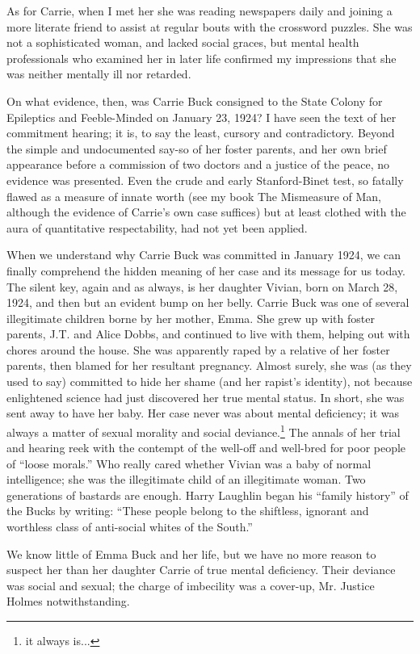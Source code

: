 \documentclass[12pt]{letter}
\begin{document}
As for Carrie, when I met her she was reading newspapers daily and joining a
more literate friend to assist at regular bouts with the crossword puzzles. She
was not a sophisticated woman, and lacked social graces, but mental health
professionals who examined her in later life confirmed my impressions that
she was neither mentally ill nor retarded.

On what evidence, then, was Carrie Buck consigned to the State Colony for Epileptics
and Feeble-Minded on January 23, 1924? I have seen the text of her commitment
hearing; it is, to say the least, cursory and contradictory. Beyond the simple and
undocumented say-so of her foster parents, and her own brief appearance before a
commission of two doctors and a justice of the peace, no evidence was presented. Even
the crude and early Stanford-Binet test, so fatally flawed as a measure of innate worth
(see my book The Mismeasure of Man, although the evidence of Carrie’s own case
suffices) but at least clothed with the aura of quantitative respectability, had not yet been
applied.

When we understand why Carrie Buck was committed in January 1924, we can finally
comprehend the hidden meaning of her case and its message for us today. The silent key,
again and as always, is her daughter Vivian, born on March 28, 1924, and then but an
evident bump on her belly. Carrie Buck was one of several illegitimate children borne by
her mother, Emma. She grew up with foster parents, J.T. and Alice Dobbs, and continued
to live with them, helping out with chores around the house. She was apparently raped by
a relative of her foster parents, then blamed for her resultant pregnancy. Almost surely,
she was (as they used to say) committed to hide her shame (and her rapist’s identity), not
because enlightened science had just discovered her true mental status. In short, she was
sent away to have her baby. Her case never was about mental deficiency; it was always a
matter of sexual morality and social deviance.\footnote{it always is...} The annals of her trial and hearing reek
with the contempt of the well-off and well-bred for poor people of “loose morals.” Who
really cared whether Vivian was a baby of normal intelligence; she was the illegitimate
child of an illegitimate woman. Two generations of bastards are enough. Harry Laughlin
began his “family history” of the Bucks by writing: “These people belong to the shiftless,
ignorant and worthless class of anti-social whites of the South.”

We know little of Emma Buck and her life, but we have no more reason to suspect her
than her daughter Carrie of true mental deficiency. Their deviance was social and sexual;
the charge of imbecility was a cover-up, Mr. Justice Holmes notwithstanding.
\end{document}
